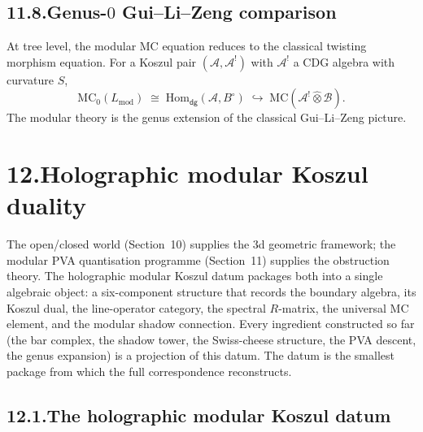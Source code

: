 \documentclass[11pt,reqno]{amsart}
\theoremstyle{definition}
\theoremstyle{remark}
\providecommand{\cA}{\mathcal{A}}
\providecommand{\cB}{\mathcal{B}}
\providecommand{\MC}{\mathrm{MC}}
\providecommand{\Hom}{\mathrm{Hom}}
\numberwithin{equation}{section}
\begin{document}
\subsection*{11.8.\enspace Genus-$0$ Gui--Li--Zeng comparison}

At tree level, the modular MC equation reduces to the
classical twisting morphism equation. For a Koszul pair
$(\cA, \cA^!)$ with $\cA^!$ a CDG algebra with curvature $S$,
\[
\MC_0(L_{\mathrm{mod}})
\;\cong\;
\Hom_{\mathsf{dg}}(\cA, B^\circ)
\;\hookrightarrow\;
\MC(\cA^! \widehat\otimes \cB).
\]
The modular theory is the genus extension of the classical
Gui--Li--Zeng picture.


\section*{12.\quad Holographic modular Koszul duality}

The open/closed world (Section~10) supplies the 3d geometric
framework; the modular PVA quantisation programme
(Section~11) supplies the obstruction theory. The holographic
modular Koszul datum packages both into a single algebraic
object: a six-component structure that records the boundary
algebra, its Koszul dual, the line-operator category, the
spectral $R$-matrix, the universal MC element, and the modular
shadow connection. Every ingredient constructed so far (the
bar complex, the shadow tower, the Swiss-cheese structure, the
PVA descent, the genus expansion) is a projection of this
datum. The datum is the smallest package from which the full
correspondence reconstructs.

\subsection*{12.1.\enspace The holographic modular Koszul datum}
\end{document}
